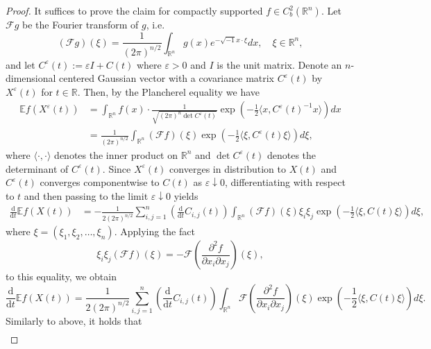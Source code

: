 \documentclass[11pt]{article}
\numberwithin{equation}{section}
\newcommand{\E}{\mathbb{E}}
\newcommand{\1}{\mathbf 1}
\begin{document}
\begin{proof}
It suffices to prove the claim for compactly supported $f\in C_b^2({\mathbb R}^n)$.  
Let ${\mathcal F}g$ be the Fourier transform of $g$, i.e.
\[
({\mathcal F} g) (\xi ) = \frac{1}{(2\pi )^{n/2}}\int _{\mathbb R^n} g(x) e^{-\sqrt{-1}x\cdot \xi } dx, \quad \xi \in {\mathbb R}^n ,
\]
and let $C^\varepsilon (t) := \varepsilon I + C(t)$ where $\varepsilon >0$ and $I$ is the unit matrix.
Denote an $n$-dimensional centered Gaussian vector with a covariance matrix $C^\varepsilon (t)$ by $X^\varepsilon (t)$ for $t\in {\mathbb R}$.
Then, by the Plancherel equality we have
\begin{align*}
\E f(X^\varepsilon (t)) &= \int _{{\mathbb R}^n} f(x) \cdot \frac{1}{\sqrt{(2\pi)^n \det C^\varepsilon(t)}} \exp \left( -\frac{1}{2}\langle x , C^\varepsilon (t)^{-1} x \rangle \right) dx \\
%
&= \frac{1}{(2\pi )^{n/2}} \int _{{\mathbb R}^n} ({\mathcal F}f)(\xi ) \exp \left( -\frac{1}{2} \langle \xi , C^\varepsilon (t)\xi \rangle \right) d\xi,
\end{align*}
where $\langle \cdot ,\cdot \rangle$ denotes the inner product on ${\mathbb R}^n$ and $\det C^\varepsilon(t)$ denotes the determinant of $C^\varepsilon(t)$.  Since $X^\varepsilon(t)$ converges in distribution to $X(t)$ and $C^\varepsilon(t)$ converges componentwise to $C(t)$ as $\varepsilon\downarrow0$, differentiating with respect to $t$ and then passing to the limit $\varepsilon\downarrow0$ yields  
\begin{align*}
\frac{\mathrm d}{\mathrm dt} \E f(X(t)) &= - \frac{1}{2(2\pi )^{n/2}}\sum _{i,j =1}^n \left( \frac{\mathrm d}{\mathrm dt} C_{i,j}(t)\right) \int _{{\mathbb R}^n} ({\mathcal F}f)(\xi ) \xi _i \xi _j \exp \left( -\frac{1}{2} \langle \xi , C(t)\xi \rangle \right) d\xi,
\end{align*}
where $\xi = (\xi _1, \xi _2 ,\dots , \xi _n)$.
Applying the fact
\[
\xi _i \xi _j ({\mathcal F}f)(\xi ) = - {\mathcal F} \left( \frac{\partial ^2 f}{\partial x_i \partial x_j} \right)(\xi ) ,
\]
to this equality, we obtain
\begin{equation}\label{eq:Price01}
\frac{\mathrm d}{\mathrm dt} \E f(X(t)) = \frac{1}{2(2\pi )^{n/2}}\sum _{i,j =1}^n \left( \frac{\mathrm d}{\mathrm dt} C_{i,j}(t)\right) \int _{{\mathbb R}^n} {\mathcal F} \left( \frac{\partial ^2 f}{\partial x_i \partial x_j} \right)(\xi ) \exp \left( -\frac{1}{2} \langle \xi , C(t)\xi \rangle \right) d\xi .
\end{equation}
Similarly to above, it holds that
\begin{align*}

\end{align*}
\end{proof}
\end{document}
